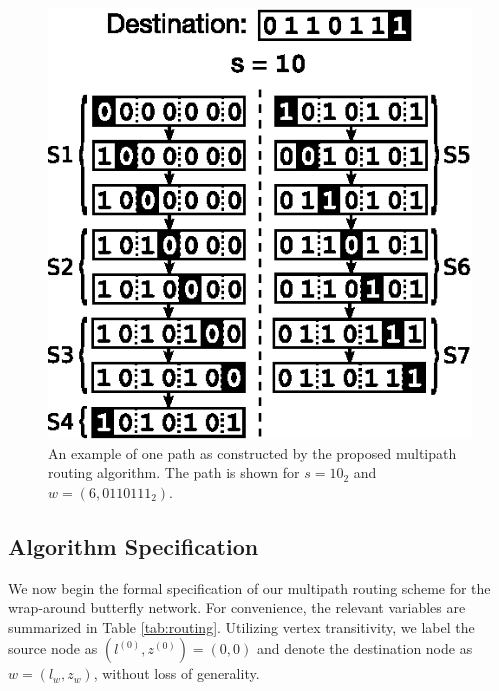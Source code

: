 \documentclass[10pt,letterpaper]{article}
\begin{document}
\begin{figure}[!h]
\begin{center}
\includegraphics{fig-routing}
\end{center}
\caption{
An example of one path as constructed by the proposed multipath
routing algorithm.
The path is shown for $s = 10_2$
and $w = (6, 0110111_2)$.
\label{fig:routing}
}
\end{figure}

\subsection*{Algorithm Specification}

We now begin the formal specification of our multipath routing scheme for the
wrap-around butterfly network.
For convenience, the relevant variables are summarized in Table \ref{tab:routing}.
Utilizing vertex transitivity, we label the source node as
$(l^{(0)}, z^{(0)}) = (0, 0)$ and denote the destination node as $w = (l_w, z_w)$,
without loss of generality.
\end{document}
